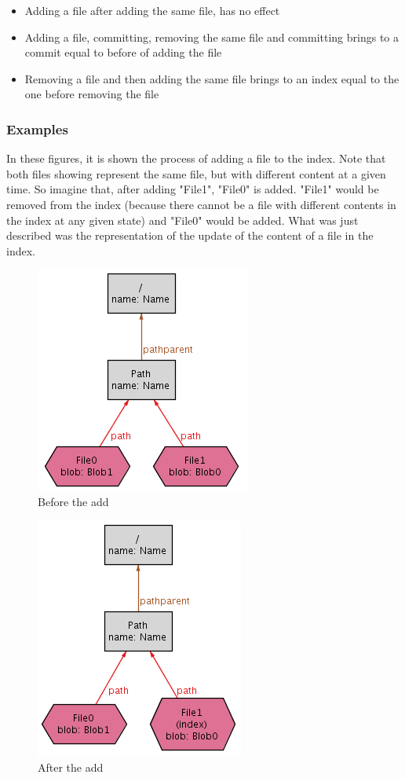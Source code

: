 \begin{itemize}
	\item Adding a file after adding the same file, has no effect
	\item Adding a file, committing, removing the same file and 
	committing brings to a commit equal to before of adding the file
	\item Removing a file and then adding the same file brings to an
	index equal to the one before removing the file
\end{itemize}

\subsubsection{Examples}

In these figures, it is shown the process of adding a file to the index. Note
that both files showing represent the same file, but with different content at
a given time. So imagine that, after adding "File1", "File0" is added. "File1"
would be removed from the index (because there cannot be a file with different
contents in the index at any given state) and "File0" would be added. What was
just described was the representation of the update of the content of a file in the
index. \par 
\begin{figure}[h!] 
	\caption{Before the add}
	\centering
	\includegraphics[scale=0.65]{images/add1.png}
\end{figure}

\begin{figure}[h!] 
	\caption{After the add}
	\centering
	\includegraphics[scale=0.65]{images/add2.png}
\end{figure}

